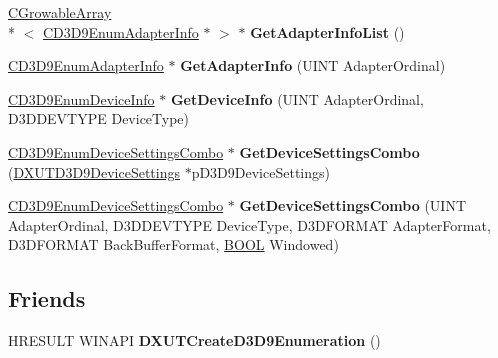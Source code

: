 \begin{DoxyCompactItemize}
\item 
\hypertarget{class_c_d3_d9_enumeration_a431a52570c598b918d546fbb1fe4b53a}{\hyperlink{class_c_growable_array}{C\+Growable\+Array}\\*
$<$ \hyperlink{class_c_d3_d9_enum_adapter_info}{C\+D3\+D9\+Enum\+Adapter\+Info} $\ast$ $>$ $\ast$ {\bfseries Get\+Adapter\+Info\+List} ()}\label{class_c_d3_d9_enumeration_a431a52570c598b918d546fbb1fe4b53a}

\item 
\hypertarget{class_c_d3_d9_enumeration_a82771186af004fbbbb552dc831fe8b70}{\hyperlink{class_c_d3_d9_enum_adapter_info}{C\+D3\+D9\+Enum\+Adapter\+Info} $\ast$ {\bfseries Get\+Adapter\+Info} (U\+I\+N\+T Adapter\+Ordinal)}\label{class_c_d3_d9_enumeration_a82771186af004fbbbb552dc831fe8b70}

\item 
\hypertarget{class_c_d3_d9_enumeration_ad1a5b68311b3f5514e68cdc694d1cb8d}{\hyperlink{class_c_d3_d9_enum_device_info}{C\+D3\+D9\+Enum\+Device\+Info} $\ast$ {\bfseries Get\+Device\+Info} (U\+I\+N\+T Adapter\+Ordinal, D3\+D\+D\+E\+V\+T\+Y\+P\+E Device\+Type)}\label{class_c_d3_d9_enumeration_ad1a5b68311b3f5514e68cdc694d1cb8d}

\item 
\hypertarget{class_c_d3_d9_enumeration_a70a30a5d8bd545cb21c78314a05862c8}{\hyperlink{struct_c_d3_d9_enum_device_settings_combo}{C\+D3\+D9\+Enum\+Device\+Settings\+Combo} $\ast$ {\bfseries Get\+Device\+Settings\+Combo} (\hyperlink{struct_d_x_u_t_d3_d9_device_settings}{D\+X\+U\+T\+D3\+D9\+Device\+Settings} $\ast$p\+D3\+D9\+Device\+Settings)}\label{class_c_d3_d9_enumeration_a70a30a5d8bd545cb21c78314a05862c8}

\item 
\hypertarget{class_c_d3_d9_enumeration_a8624274c82df452e7c8551a260f1805b}{\hyperlink{struct_c_d3_d9_enum_device_settings_combo}{C\+D3\+D9\+Enum\+Device\+Settings\+Combo} $\ast$ {\bfseries Get\+Device\+Settings\+Combo} (U\+I\+N\+T Adapter\+Ordinal, D3\+D\+D\+E\+V\+T\+Y\+P\+E Device\+Type, D3\+D\+F\+O\+R\+M\+A\+T Adapter\+Format, D3\+D\+F\+O\+R\+M\+A\+T Back\+Buffer\+Format, \hyperlink{_ice_types_8h_a050c65e107f0c828f856a231f4b4e788}{B\+O\+O\+L} Windowed)}\label{class_c_d3_d9_enumeration_a8624274c82df452e7c8551a260f1805b}

\end{DoxyCompactItemize}
\subsection*{Friends}
\begin{DoxyCompactItemize}
\item 
\hypertarget{class_c_d3_d9_enumeration_a4cb4e507b6f9749ebe8f607f834edd2f}{H\+R\+E\+S\+U\+L\+T W\+I\+N\+A\+P\+I {\bfseries D\+X\+U\+T\+Create\+D3\+D9\+Enumeration} ()}\label{class_c_d3_d9_enumeration_a4cb4e507b6f9749ebe8f607f834edd2f}

\end{DoxyCompactItemize}


